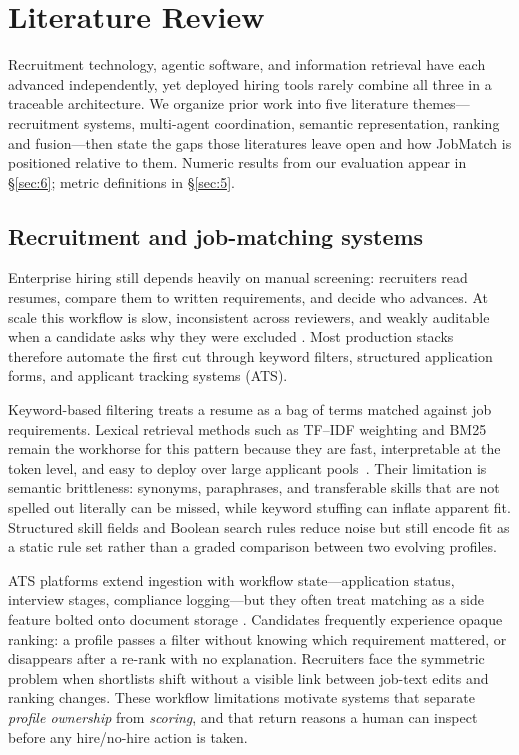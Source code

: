 \section{Literature Review}\label{sec:2}

Recruitment technology, agentic software, and information retrieval have each advanced independently, yet deployed hiring tools rarely combine all three in a traceable architecture.
We organize prior work into five literature themes---recruitment systems, multi-agent coordination, semantic representation, ranking and fusion---then state the gaps those literatures leave open and how JobMatch is positioned relative to them.
Numeric results from our evaluation appear in \S\ref{sec:6}; metric definitions in \S\ref{sec:5}.

\subsection{Recruitment and job-matching systems}\label{sec:2-recruitment}

Enterprise hiring still depends heavily on manual screening: recruiters read resumes, compare them to written requirements, and decide who advances.
At scale this workflow is slow, inconsistent across reviewers, and weakly auditable when a candidate asks why they were excluded .
Most production stacks therefore automate the first cut through keyword filters, structured application forms, and applicant tracking systems (ATS).

Keyword-based filtering treats a resume as a bag of terms matched against job requirements.
Lexical retrieval methods such as TF--IDF weighting and BM25 remain the workhorse for this pattern because they are fast, interpretable at the token level, and easy to deploy over large applicant pools~\cite{Manning2008,Robertson2009}.
Their limitation is semantic brittleness: synonyms, paraphrases, and transferable skills that are not spelled out literally can be missed, while keyword stuffing can inflate apparent fit.
Structured skill fields and Boolean search rules reduce noise but still encode fit as a static rule set rather than a graded comparison between two evolving profiles.

ATS platforms extend ingestion with workflow state---application status, interview stages, compliance logging---but they often treat matching as a side feature bolted onto document storage .
Candidates frequently experience opaque ranking: a profile passes a filter without knowing which requirement mattered, or disappears after a re-rank with no explanation.
Recruiters face the symmetric problem when shortlists shift without a visible link between job-text edits and ranking changes.
These workflow limitations motivate systems that separate \emph{profile ownership} from \emph{scoring}, and that return reasons a human can inspect before any hire/no-hire action is taken.

